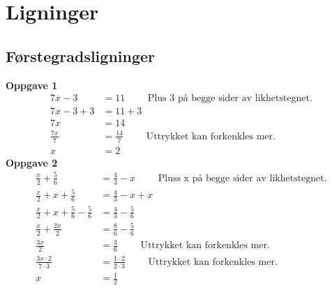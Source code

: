 \documentclass[12pt,twoside,onecolumn]{article}
\begin{document}

\newpage\null\newpage
{} 


\section*{Ligninger}

\subsection*{Førstegradsligninger}

\textbf{Oppgave 1}
\begin{align}
7x - 3 &= 11  \qquad\text{ Plus 3 på begge sider av likhetstegnet.}\\
7x -3 +3 &= 11 + 3\\
7x &= 14\\  
\frac{7x}{7} &=  \frac{14}{7} \qquad\text{ Uttrykket kan forkenkles mer.}\\
x &= 2
\end{align}
\newline
\textbf{Oppgave 2}
\begin{align}
\frac{x}{2} + \frac{5}{6} &=  \frac{4}{3} - x \qquad\text{ Pluss x på begge sider av likhetstegnet.}\\
\frac{x}{2} + x + \frac{5}{6} &=  \frac{4}{3} - x + x\\
\frac{x}{2} + x + \frac{5}{6} - \frac{5}{6} &=  \frac{4}{3} - \frac{5}{6}\\
\frac{x}{2} + \frac{2x}{2} &= \frac{8}{6} - \frac{5}{6}\\
\frac{3x}{2}  &= \frac{3}{6} \qquad\text{ Uttrykket kan forkenkles mer.}\\ 
\frac{3x\cdot2}{7\cdot3} &=  \frac{1\cdot2}{2\cdot3} \qquad\text{ Uttrykket kan forkenkles mer.}\\
x &= \frac{1}{2}
\end{align}
\end{document}
